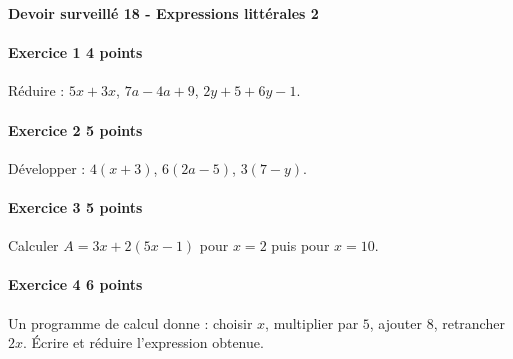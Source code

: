 \documentclass[a4paper,10pt]{article}
\newenvironment{exercice}[2]{\paragraph{Exercice #1 \hfill #2 points}\mbox{}\par}{\medskip}
\begin{document}
\begin{center}\Large\bfseries Devoir surveillé 18 - Expressions littérales 2\end{center}
\vspace{2mm}
\begin{exercice}{1}{4}Réduire : $5x+3x$, $7a-4a+9$, $2y+5+6y-1$.\end{exercice}\begin{exercice}{2}{5}Développer : $4(x+3)$, $6(2a-5)$, $3(7-y)$.\end{exercice}\begin{exercice}{3}{5}Calculer $A=3x+2(5x-1)$ pour $x=2$ puis pour $x=10$.\end{exercice}\begin{exercice}{4}{6}Un programme de calcul donne : choisir $x$, multiplier par $5$, ajouter $8$, retrancher $2x$. Écrire et réduire l'expression obtenue.\end{exercice}
\end{document}
